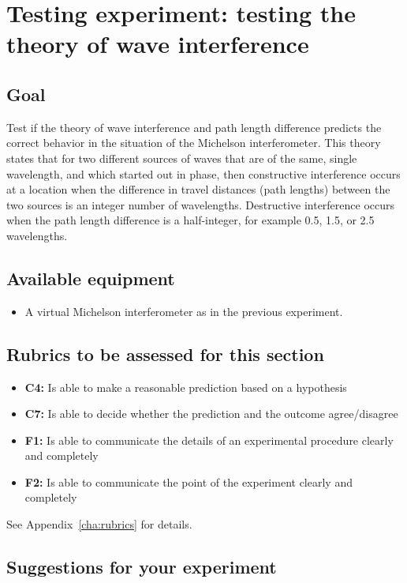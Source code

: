 \section{Testing experiment: testing the theory of wave interference}

\subsection{Goal}

Test if the theory of wave interference and path length difference predicts the correct behavior in the situation of the Michelson interferometer. This theory states that for two different sources of waves that are of the same, single wavelength, and which started out in phase, then constructive interference occurs at a location when the difference in travel distances (path lengths) between the two sources is an integer number of wavelengths. Destructive interference occurs when the path length difference is a half-integer, for example 0.5, 1.5, or 2.5 wavelengths.

\subsection{Available equipment}

\begin{itemize}
	\item A virtual Michelson interferometer as in the previous experiment.
\end{itemize}

\subsection{Rubrics to be assessed for this section}

\begin{itemize}
	\item \textbf{C4:} Is able to make a reasonable prediction based on a hypothesis
	\item \textbf{C7:} Is able to decide whether the prediction and the outcome agree/disagree
	\item \textbf{F1:} Is able to communicate the details of an experimental procedure clearly and completely
	\item \textbf{F2:} Is able to communicate the point of the experiment clearly and completely
\end{itemize}
See Appendix~\ref{cha:rubrics} for details.

\subsection{Suggestions for your experiment}

